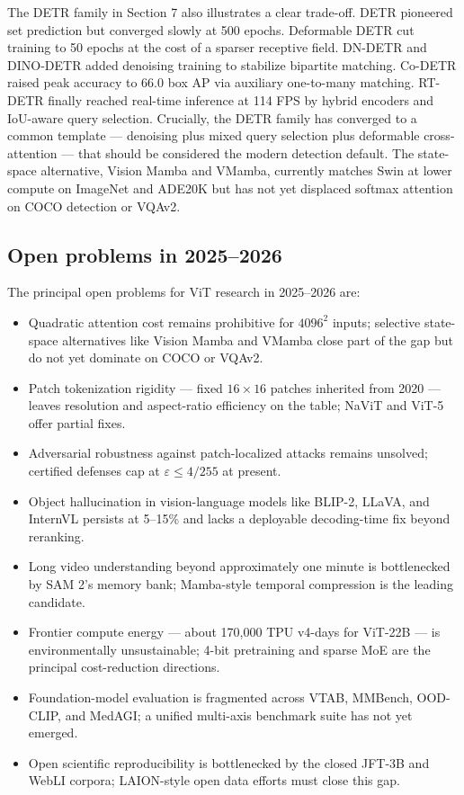 \documentclass{article}
\begin{document}
The DETR family in Section 7 also illustrates a clear trade-off. DETR pioneered set prediction but converged slowly at 500 epochs. Deformable DETR cut training to 50 epochs at the cost of a sparser receptive field. DN-DETR and DINO-DETR added denoising training to stabilize bipartite matching. Co-DETR raised peak accuracy to 66.0 box AP via auxiliary one-to-many matching. RT-DETR finally reached real-time inference at 114 FPS by hybrid encoders and IoU-aware query selection. Crucially, the DETR family has converged to a common template --- denoising plus mixed query selection plus deformable cross-attention --- that should be considered the modern detection default. The state-space alternative, Vision Mamba and VMamba, currently matches Swin at lower compute on ImageNet and ADE20K but has not yet displaced softmax attention on COCO detection or VQAv2.

\subsection{Open problems in 2025--2026}\label{open-problems-in-20252026}

The principal open problems for ViT research in 2025--2026 are:

\begin{itemize}

\item
  Quadratic attention cost remains prohibitive for \(4096^2\) inputs; selective state-space alternatives like Vision Mamba and VMamba close part of the gap but do not yet dominate on COCO or VQAv2.
\item
  Patch tokenization rigidity --- fixed \(16 \times 16\) patches inherited from 2020 --- leaves resolution and aspect-ratio efficiency on the table; NaViT and ViT-5 offer partial fixes.
\item
  Adversarial robustness against patch-localized attacks remains unsolved; certified defenses cap at \(\varepsilon \le 4/255\) at present.
\item
  Object hallucination in vision-language models like BLIP-2, LLaVA, and InternVL persists at 5--15\% and lacks a deployable decoding-time fix beyond reranking.
\item
  Long video understanding beyond approximately one minute is bottlenecked by SAM 2's memory bank; Mamba-style temporal compression is the leading candidate.
\item
  Frontier compute energy --- about 170,000 TPU v4-days for ViT-22B --- is environmentally unsustainable; 4-bit pretraining and sparse MoE are the principal cost-reduction directions.
\item
  Foundation-model evaluation is fragmented across VTAB, MMBench, OOD-CLIP, and MedAGI; a unified multi-axis benchmark suite has not yet emerged.
\item
  Open scientific reproducibility is bottlenecked by the closed JFT-3B and WebLI corpora; LAION-style open data efforts must close this gap.
\end{itemize}
\end{document}
